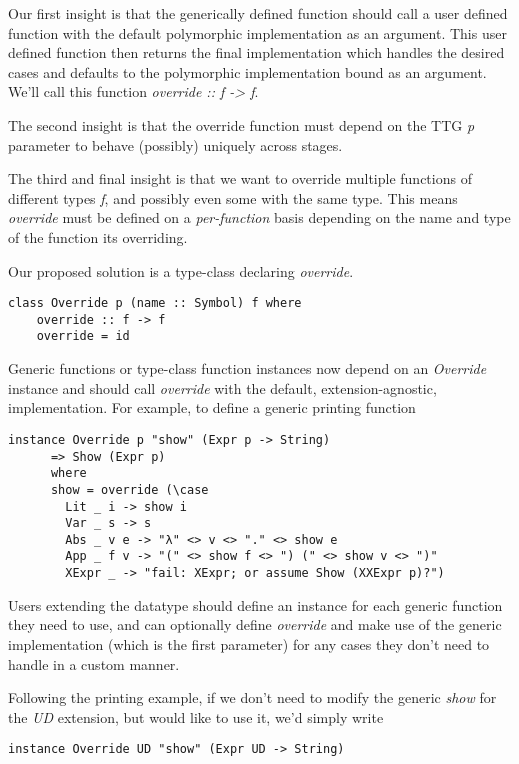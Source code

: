 \documentclass{article}
\begin{document}
Our first insight is that the generically defined function should call a user
defined function with the default polymorphic implementation as an argument.
This user defined function then returns the final implementation which handles
the desired cases and defaults to the polymorphic implementation bound as an
argument. We'll call this function \emph{override :: f -> f}.

The second insight is that the override function must depend on the TTG \emph{p}
parameter to behave (possibly) uniquely across stages.

The third and final insight is that we want to override multiple
functions of different types \emph{f}, and possibly even some with the same
type. This means \emph{override} must be defined on a \emph{per-function} basis
depending on the name and type of the function its overriding.

Our proposed solution is a type-class declaring \emph{override}.

\begin{lstlisting}
class Override p (name :: Symbol) f where
    override :: f -> f
    override = id
\end{lstlisting}

Generic functions or type-class function instances now depend on an \emph{Override}
instance and should call \emph{override} with the default, extension-agnostic,
implementation. For example, to define a generic printing function

\begin{lstlisting}
instance Override p "show" (Expr p -> String)
      => Show (Expr p)
      where
      show = override (\case
        Lit _ i -> show i
        Var _ s -> s
        Abs _ v e -> "λ" <> v <> "." <> show e
        App _ f v -> "(" <> show f <> ") (" <> show v <> ")"
        XExpr _ -> "fail: XExpr; or assume Show (XXExpr p)?")
\end{lstlisting}

Users extending the datatype should define an instance for
each generic function they need to use, and can optionally define
\emph{override} and make use of the generic implementation (which is the first
parameter) for any cases they don't need to handle in a custom manner.

Following the printing example, if we don't need to modify the generic
\emph{show} for the \emph{UD} extension, but would like to use it, we'd simply
write
\begin{lstlisting}
instance Override UD "show" (Expr UD -> String)
\end{lstlisting}
\end{document}

